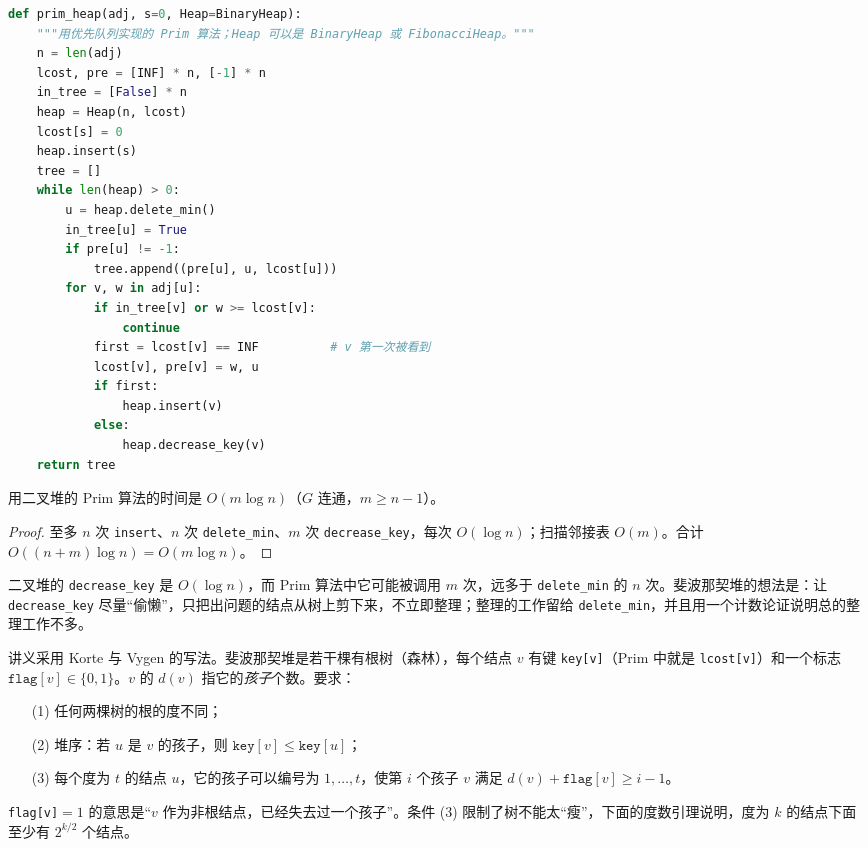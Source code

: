 \begin{lstlisting}[language=Python]
def prim_heap(adj, s=0, Heap=BinaryHeap):
    """用优先队列实现的 Prim 算法；Heap 可以是 BinaryHeap 或 FibonacciHeap。"""
    n = len(adj)
    lcost, pre = [INF] * n, [-1] * n
    in_tree = [False] * n
    heap = Heap(n, lcost)
    lcost[s] = 0
    heap.insert(s)
    tree = []
    while len(heap) > 0:
        u = heap.delete_min()
        in_tree[u] = True
        if pre[u] != -1:
            tree.append((pre[u], u, lcost[u]))
        for v, w in adj[u]:
            if in_tree[v] or w >= lcost[v]:
                continue
            first = lcost[v] == INF          # v 第一次被看到
            lcost[v], pre[v] = w, u
            if first:
                heap.insert(v)
            else:
                heap.decrease_key(v)
    return tree
\end{lstlisting}

\begin{theorem}\label{thm:mst-prim:binary}
用二叉堆的 Prim 算法的时间是 $O(m\log n)$（$G$ 连通，$m\geqslant n-1$）。
\end{theorem}
\begin{proof}
至多 $n$ 次 \texttt{insert}、$n$ 次 \texttt{delete\_min}、$m$ 次 \texttt{decrease\_key}，每次 $O(\log n)$；扫描邻接表 $O(m)$。合计 $O((n+m)\log n)=O(m\log n)$。
\end{proof}


二叉堆的 \texttt{decrease\_key} 是 $O(\log n)$，而 Prim 算法中它可能被调用 $m$ 次，远多于 \texttt{delete\_min} 的 $n$ 次。斐波那契堆的想法是：让 \texttt{decrease\_key} 尽量“偷懒”，只把出问题的结点从树上剪下来，不立即整理；整理的工作留给 \texttt{delete\_min}，并且用一个计数论证说明总的整理工作不多。

讲义采用 Korte 与 Vygen 的写法。斐波那契堆是若干棵有根树（森林），每个结点 $v$ 有键 \texttt{key[v]}（Prim 中就是 \texttt{lcost[v]}）和一个标志 $\texttt{flag}[v]\in\{0,1\}$。$v$ 的 $d(v)$ 指它的\emph{孩子}个数。要求：
\begin{enumerate}
\item[(1)] 任何两棵树的根的度不同；
\item[(2)] 堆序：若 $u$ 是 $v$ 的孩子，则 $\texttt{key}[v]\leqslant\texttt{key}[u]$；
\item[(3)] 每个度为 $t$ 的结点 $u$，它的孩子可以编号为 $1,\dots,t$，使第 $i$ 个孩子 $v$ 满足 $d(v)+\texttt{flag}[v]\geqslant i-1$。
\end{enumerate}
\texttt{flag[v]}$=1$ 的意思是“$v$ 作为非根结点，已经失去过一个孩子”。条件 (3) 限制了树不能太“瘦”，下面的度数引理说明，度为 $k$ 的结点下面至少有 $2^{k/2}$ 个结点。

